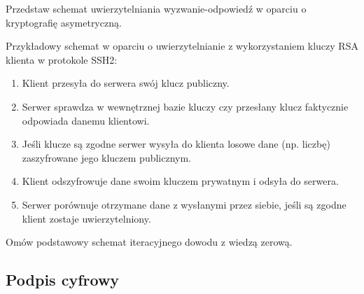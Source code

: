 \documentclass[answers,11pt]{exam}
\begin{document}
\begin{questions}
\question Przedstaw schemat uwierzytelniania wyzwanie-odpowiedź w oparciu o kryptografię asymetryczną.

\begin{solution}
Przykładowy schemat w oparciu o uwierzytelnianie z wykorzystaniem kluczy RSA klienta w protokole SSH2:
\begin{enumerate}
\item Klient przesyła do serwera swój klucz publiczny.
\item Serwer sprawdza w wewnętrznej bazie kluczy czy przesłany klucz faktycznie odpowiada danemu klientowi.
\item Jeśli klucze są zgodne serwer wysyła do klienta losowe dane (np. liczbę) zaszyfrowane jego kluczem publicznym.
\item Klient odszyfrowuje dane swoim kluczem prywatnym i odsyła do serwera.
\item Serwer porównuje otrzymane dane z wysłanymi przez siebie, jeśli są zgodne klient zostaje uwierzytelniony.
\end{enumerate}
\end{solution}

\question Omów podstawowy schemat iteracyjnego dowodu z wiedzą zerową.

\end{questions}


\subsection{Podpis cyfrowy}
\end{document}
